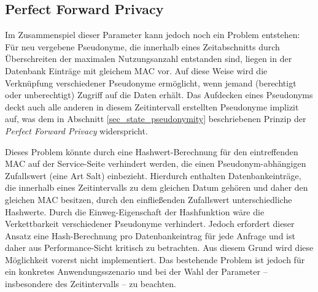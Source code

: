 \subsection{Perfect Forward Privacy}

\label{impl_pseudo_pfp}

Im Zusammenspiel dieser Parameter kann jedoch noch ein Problem entstehen: Für neu vergebene Pseudonyme, die innerhalb eines Zeitabschnitts durch Überschreiten der maximalen Nutzungsanzahl entstanden sind, liegen in der Datenbank Einträge mit gleichem MAC vor. Auf diese Weise wird die Verknüpfung verschiedener Pseudonyme ermöglicht, wenn jemand (berechtigt oder unberechtigt) Zugriff auf die Daten erhält. Das Aufdecken eines Pseudonyms deckt auch alle anderen in diesem Zeitintervall erstellten Pseudonyme implizit auf, was dem in Abschnitt \ref{sec_state_pseudonymity} beschriebenen Prinzip der \textit{Perfect Forward Privacy} widerspricht. 

Dieses Problem könnte durch eine Hashwert-Berechnung für den eintreffenden MAC auf der Service-Seite verhindert werden, die einen Pseudonym-abhängigen Zufallswert (eine Art Salt) einbezieht. Hierdurch enthalten Datenbankeinträge, die innerhalb eines Zeitintervalls zu dem gleichen Datum gehören und daher den gleichen MAC besitzen, durch den einfließenden Zufallswert unterschiedliche Hashwerte. Durch die Einweg-Eigenschaft der Hashfunktion wäre die Verkettbarkeit verschiedener Pseudonyme verhindert. 
Jedoch erfordert dieser Ansatz eine Hash-Berechnung pro Datenbankeintrag für jede Anfrage und ist daher aus Performance-Sicht kritisch zu betrachten. Aus diesem Grund wird diese Möglichkeit vorerst nicht implementiert. Das bestehende Problem ist jedoch für ein konkretes Anwendungsszenario und bei der Wahl der Parameter -- insbesondere des Zeitintervalls -- zu beachten.
